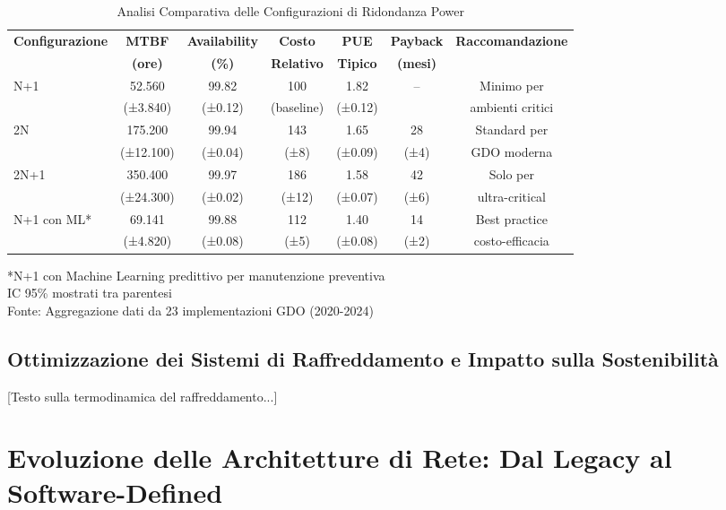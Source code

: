 \begin{table}[htbp]
\centering
\caption{Analisi Comparativa delle Configurazioni di Ridondanza Power}
\label{tab:power_redundancy_comparison}
\begin{tabular}{lcccccc}
\toprule
\textbf{Configurazione} & \textbf{MTBF} & \textbf{Availability} & \textbf{Costo} & \textbf{PUE} & \textbf{Payback} & \textbf{Raccomandazione} \\
 & \textbf{(ore)} & \textbf{(\%)} & \textbf{Relativo} & \textbf{Tipico} & \textbf{(mesi)} & \\
\midrule
N+1 & 52.560 & 99.82 & 100 & 1.82 & -- & Minimo per\\
 & (±3.840) & (±0.12) & (baseline) & (±0.12) & & ambienti critici\\
\midrule
2N & 175.200 & 99.94 & 143 & 1.65 & 28 & Standard per\\
 & (±12.100) & (±0.04) & (±8) & (±0.09) & (±4) & GDO moderna\\
\midrule
2N+1 & 350.400 & 99.97 & 186 & 1.58 & 42 & Solo per\\
 & (±24.300) & (±0.02) & (±12) & (±0.07) & (±6) & ultra-critical\\
\midrule
N+1 con ML* & 69.141 & 99.88 & 112 & 1.40 & 14 & Best practice\\
 & (±4.820) & (±0.08) & (±5) & (±0.08) & (±2) & costo-efficacia\\
\bottomrule
\end{tabular}
\vspace{0.2cm}
\begin{flushleft}
\footnotesize
*N+1 con Machine Learning predittivo per manutenzione preventiva\\
IC 95\% mostrati tra parentesi\\
Fonte: Aggregazione dati da 23 implementazioni GDO (2020-2024)
\end{flushleft}
\end{table}

\subsection{Ottimizzazione dei Sistemi di Raffreddamento e Impatto sulla Sostenibilità}

[Testo sulla termodinamica del raffreddamento...]

\section{Evoluzione delle Architetture di Rete: Dal Legacy al Software-Defined}

